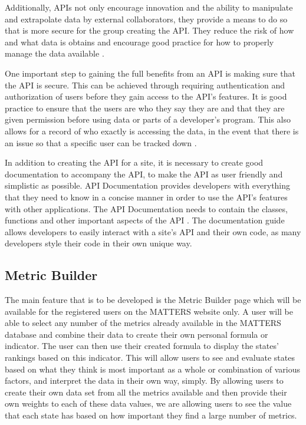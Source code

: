 		Additionally, APIs not only encourage innovation and the ability to manipulate and 
		extrapolate data by external collaborators, they provide a means to do so that is 
		more secure for the group creating the API. They reduce the risk of how and what data 
		is obtains and encourage good practice for how to properly manage the data 
		available \cite{readwrite}.

	One important step to gaining the full benefits from an API is making sure that the API is 
	secure. This can be achieved through requiring authentication and authorization of users 
	before they gain access to the API's features. It is good practice to ensure that the users 
	are who they say they are and that they are given permission before using data or parts of 
	a developer's program. This also allows for a record of who exactly is accessing the data, 
	in the event that there is an issue so that a specific user can be tracked down \cite{jisc}.

	In addition to creating the API for a site, it is necessary to create good documentation to 
	accompany the API, to make the API as user friendly and simplistic as possible. 
	API Documentation provides developers with everything that they need to know in a concise 
	manner in order to use the API’s features with other applications. The API Documentation 
	needs to contain the classes, functions and other important aspects of the API \cite{cio}. 
	The documentation guide allows developers to easily interact with a site's API and their 
	own code, as many developers style their code in their own unique way. 

	\subsection{Metric Builder}

		The main feature that is to be developed is the Metric Builder page which will be available 
		for the registered users on the MATTERS website only. A user will be able to select any 
		number of the metrics already available in the MATTERS database and combine their data to 
		create their own personal formula or indicator. The user can then use their created formula 
		to display the states' rankings based on this indicator. This will allow users to see and 
		evaluate states based on what they think is most important as a whole or combination of 
		various factors, and interpret the data in their own way, simply. By allowing users to 
		create their own data set from all the metrics available and then provide their own weights 
		to each of these data values, we are allowing users to see the value that each state has 
		based on how important they find a large number of metrics.

